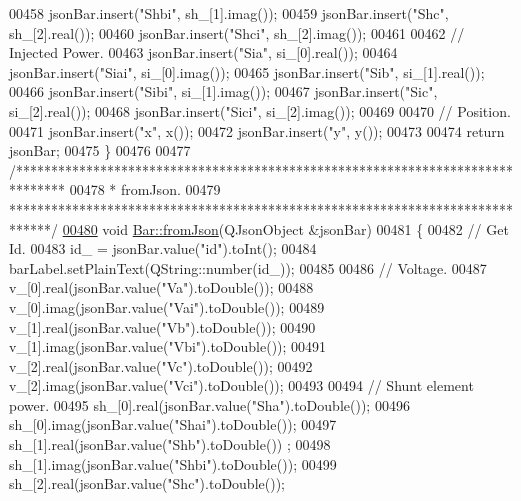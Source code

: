 \begin{DoxyCode}
00458   jsonBar.insert(\textcolor{stringliteral}{"Shbi"}, sh\_[1].imag());
00459   jsonBar.insert(\textcolor{stringliteral}{"Shc"}, sh\_[2].real());
00460   jsonBar.insert(\textcolor{stringliteral}{"Shci"}, sh\_[2].imag());
00461 
00462   \textcolor{comment}{// Injected Power.}
00463   jsonBar.insert(\textcolor{stringliteral}{"Sia"}, si\_[0].real());
00464   jsonBar.insert(\textcolor{stringliteral}{"Siai"}, si\_[0].imag());
00465   jsonBar.insert(\textcolor{stringliteral}{"Sib"}, si\_[1].real());
00466   jsonBar.insert(\textcolor{stringliteral}{"Sibi"}, si\_[1].imag());
00467   jsonBar.insert(\textcolor{stringliteral}{"Sic"}, si\_[2].real());
00468   jsonBar.insert(\textcolor{stringliteral}{"Sici"}, si\_[2].imag());
00469 
00470   \textcolor{comment}{// Position.}
00471   jsonBar.insert(\textcolor{stringliteral}{"x"}, x());
00472   jsonBar.insert(\textcolor{stringliteral}{"y"}, y());
00473 
00474   \textcolor{keywordflow}{return} jsonBar;
00475 \}
00476 
00477 \textcolor{comment}{/*******************************************************************************}
00478 \textcolor{comment}{ * fromJson.}
00479 \textcolor{comment}{ ******************************************************************************/}
\hypertarget{bar_8cpp_source_l00480}{}\hyperlink{group___models_ga1df62f03dd3a066ceaf6588ba6bb6004}{00480} \textcolor{keywordtype}{void} \hyperlink{group___models_ga1df62f03dd3a066ceaf6588ba6bb6004}{Bar::fromJson}(QJsonObject &jsonBar)
00481 \{
00482   \textcolor{comment}{// Get Id.}
00483   id\_ = jsonBar.value(\textcolor{stringliteral}{"id"}).toInt();
00484   barLabel.setPlainText(QString::number(id\_));
00485 
00486   \textcolor{comment}{// Voltage.}
00487   v\_[0].real(jsonBar.value(\textcolor{stringliteral}{"Va"}).toDouble());
00488   v\_[0].imag(jsonBar.value(\textcolor{stringliteral}{"Vai"}).toDouble());
00489   v\_[1].real(jsonBar.value(\textcolor{stringliteral}{"Vb"}).toDouble());
00490   v\_[1].imag(jsonBar.value(\textcolor{stringliteral}{"Vbi"}).toDouble());
00491   v\_[2].real(jsonBar.value(\textcolor{stringliteral}{"Vc"}).toDouble());
00492   v\_[2].imag(jsonBar.value(\textcolor{stringliteral}{"Vci"}).toDouble());
00493 
00494   \textcolor{comment}{// Shunt element power.}
00495   sh\_[0].real(jsonBar.value(\textcolor{stringliteral}{"Sha"}).toDouble());
00496   sh\_[0].imag(jsonBar.value(\textcolor{stringliteral}{"Shai"}).toDouble());
00497   sh\_[1].real(jsonBar.value(\textcolor{stringliteral}{"Shb"}).toDouble()) ;
00498   sh\_[1].imag(jsonBar.value(\textcolor{stringliteral}{"Shbi"}).toDouble());
00499   sh\_[2].real(jsonBar.value(\textcolor{stringliteral}{"Shc"}).toDouble());

\end{DoxyCode}
